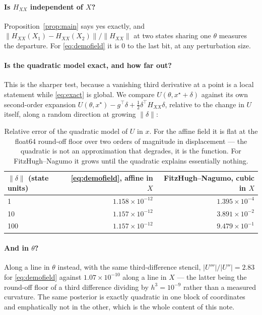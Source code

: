 \documentclass[11pt]{article}
\newcommand{\Hxx}{H_{\!X\!X}}
\newcommand{\xstar}{x^{\star}}
\theoremstyle{plain}
\theoremstyle{definition}
\theoremstyle{remark}
\begin{document}
\paragraph{Is $\Hxx$ independent of $X$?} Proposition~\ref{prop:main} says yes exactly, and
$\|\Hxx(X_1) - \Hxx(X_2)\| / \|\Hxx\|$ at two states sharing one $\theta$ measures the departure.
For \eqref{eq:demofield} it is $0$ to the last bit, at any perturbation size.

\paragraph{Is the quadratic model exact, and how far out?} This is the sharper test, because a
vanishing third derivative at a point is a local statement while \eqref{eq:exact} is global. We
compare $U(\theta, \xstar + \delta)$ against its own second-order expansion
$U(\theta,\xstar) - g^\top\delta + \tfrac12\delta^\top \Hxx \delta$, relative to the change in $U$
itself, along a random direction at growing $\|\delta\|$:

\begin{table}[h]
\centering\small
\begin{tabular}{lrr}
\toprule
$\|\delta\|$ (state units) & \eqref{eq:demofield}, affine in $X$ & FitzHugh--Nagumo, cubic in $X$\\
\midrule
1   & $1.158\times10^{-12}$ & $1.395\times10^{-4}$\\
10  & $1.157\times10^{-12}$ & $3.891\times10^{-2}$\\
100 & $1.157\times10^{-12}$ & $9.479\times10^{-1}$\\
\bottomrule
\end{tabular}
\caption{Relative error of the quadratic model of $U$ in $x$. For the affine field it is flat at
the float64 round-off floor over two orders of magnitude in displacement --- the quadratic is not
an approximation that degrades, it is the function. For FitzHugh--Nagumo it grows until the
quadratic explains essentially nothing.}
\label{tab:taylor}
\end{table}

\paragraph{And in $\theta$?} Along a line in $\theta$ instead, with the same third-difference
stencil, $|U'''|/|U''| = 2.83$ for \eqref{eq:demofield} against $1.07\times10^{-10}$ along a line
in $X$ --- the latter being the round-off floor of a third difference dividing by $h^3 = 10^{-9}$
rather than a measured curvature. The same posterior is exactly quadratic in one block of
coordinates and emphatically not in the other, which is the whole content of this note.
\end{document}
